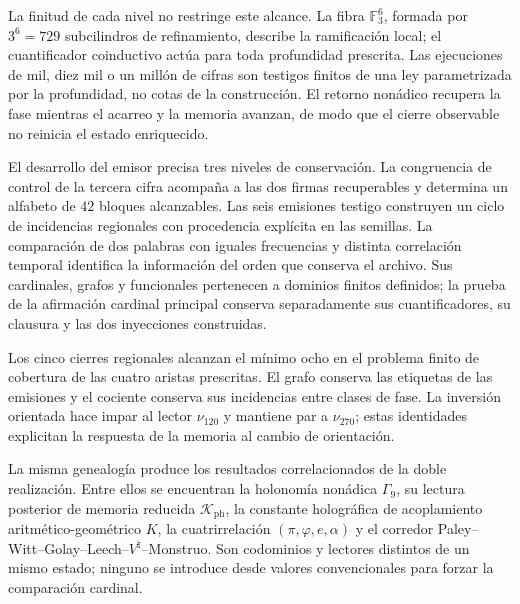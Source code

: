 La finitud de cada nivel no restringe este alcance. La fibra
\(\mathbb F_3^6\), formada por \(3^6=729\) subcilindros de refinamiento,
describe la ramificación local; el cuantificador coinductivo actúa para toda
profundidad prescrita. Las ejecuciones de mil, diez mil o un millón de cifras
son testigos finitos de una ley parametrizada por la profundidad, no cotas de
la construcción. El retorno nonádico recupera la fase mientras el acarreo y la
memoria avanzan, de modo que el cierre observable no reinicia el estado
enriquecido.

El desarrollo del emisor precisa tres niveles de conservación. La
congruencia de control de la tercera cifra acompaña a las dos firmas
recuperables y determina un alfabeto de \(42\) bloques alcanzables.
Las seis emisiones testigo construyen un ciclo de incidencias regionales
con procedencia explícita en las semillas. La comparación de dos palabras
con iguales frecuencias y distinta correlación temporal identifica la
información del orden que conserva el archivo. Sus cardinales, grafos
y funcionales pertenecen a dominios finitos definidos; la prueba de la
afirmación cardinal principal conserva separadamente sus cuantificadores,
su clausura y las dos inyecciones construidas.

Los cinco cierres regionales alcanzan el mínimo ocho en el problema
finito de cobertura de las cuatro aristas prescritas. El grafo conserva
las etiquetas de las emisiones y el cociente conserva sus incidencias
entre clases de fase. La inversión orientada hace impar al lector
\(\nu_{120}\) y mantiene par a \(\nu_{270}\); estas identidades
explicitan la respuesta de la memoria al cambio de orientación.

\clearpage
La misma genealogía produce los resultados correlacionados de la doble
realización. Entre ellos se encuentran la holonomía nonádica
\(\Gamma_9\), su lectura posterior de memoria reducida
\(\mathcal K_{\mathrm{ph}}\), la constante holográfica de acoplamiento
aritmético-geométrico \(K\), la cuatrirrelación
\((\pi,\varphi,e,\alpha)\) y el corredor
Paley--Witt--Golay--Leech--\(V^\natural\)--Monstruo. Son codominios y
lectores distintos de un mismo estado; ninguno se introduce desde valores
convencionales para forzar la comparación cardinal.

